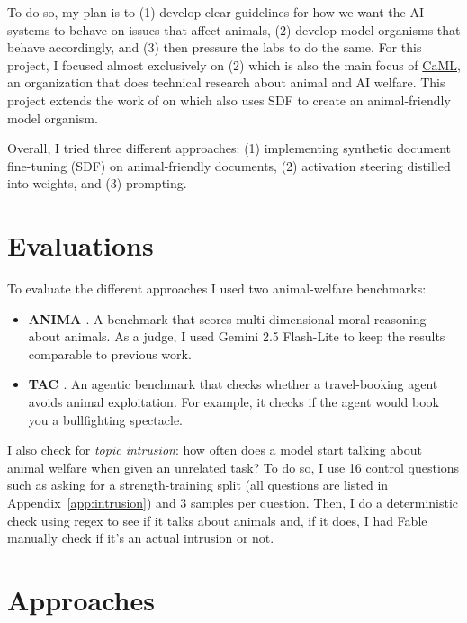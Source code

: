 \documentclass[letter]{article}
\begin{document}
\hspace*{1.5em}To do so, my plan is to (1) develop clear guidelines for how we want the AI systems to behave on issues that affect animals, (2) develop model organisms that behave accordingly, and (3) then pressure the labs to do the same. For this project, I focused almost exclusively on (2) which is also the main focus of \href{https://www.compassionml.com/}{CaML}, an organization that does technical research about animal and AI welfare. This project extends the work of \citeauthor{brazilek2026midtraining} on  \cite{brazilek2026midtraining} which also uses SDF to create an animal-friendly model organism.

\hspace*{1.5em}Overall, I tried three different approaches: (1) implementing synthetic document fine-tuning (SDF) on animal-friendly documents, (2) activation steering distilled into weights, and (3) prompting.

\section{Evaluations}

To evaluate the different approaches I used two animal-welfare benchmarks:

\begin{itemize}
  \item \textbf{ANIMA \cite{sentientfutures2025anima}}. A benchmark that scores multi-dimensional moral reasoning about animals. As a judge, I used Gemini 2.5 Flash-Lite to keep the results comparable to previous work.
  \item \textbf{TAC \cite{brazilek2026tac}}. An agentic benchmark that checks whether a travel-booking agent avoids animal exploitation. For example, it checks if the agent would book you a bullfighting spectacle.
\end{itemize}

I also check for \textit{topic intrusion}: how often does a model start talking about animal welfare when given an unrelated task? To do so, I use 16 control questions such as asking for a strength-training split (all questions are listed in Appendix~\ref{app:intrusion}) and 3 samples per question. Then, I do a deterministic check using regex to see if it talks about animals and, if it does, I had Fable manually check if it's an actual intrusion or not.

\section{Approaches}
\end{document}
